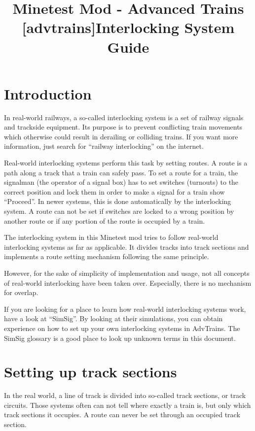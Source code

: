 \documentclass[english]{paper}
\begin{document}
\title{Minetest Mod - Advanced Trains {[}advtrains{]}}

\title{Interlocking System Guide}
\maketitle

\section{Introduction}

In real-world railways, a so-called interlocking system is a set of
railway signals and trackside equipment. Its purpose is to prevent
conflicting train movements which otherwise could result in derailing
or colliding trains. If you want more information, just search for
``railway interlocking'' on the internet.

Real-world interlocking systems perform this task by setting routes.
A route is a path along a track that a train can safely pass. To set
a route for a train, the signalman (the operator of a signal box)
has to set switches (turnouts) to the correct position and lock them
in order to make a signal for a train show ``Proceed''. In newer
systems, this is done automatically by the interlocking system. A
route can not be set if switches are locked to a wrong position by
another route or if any portion of the route is occupied by a train.

The interlocking system in this Minetest mod tries to follow real-world
interlocking systems as far as applicable. It divides tracks into
track sections and implements a route setting mechanism following
the same principle.

However, for the sake of simplicity of implementation and usage, not
all concepts of real-world interlocking have been taken over. Especially,
there is no mechanism for overlap.

If you are looking for a place to learn how real-world interlocking
systems work, have a look at ``SimSig''. By looking at their simulations,
you can obtain experience on how to set up your own interlocking systems
in AdvTrains. The SimSig glossary is a good place to look up unknown
terms in this document.

\section{Setting up track sections}

In the real world, a line of track is divided into so-called track
sections, or track circuits. Those systems often can not tell where
exactly a train is, but only which track sections it occupies. A route
can never be set through an occupied track section.
\end{document}
